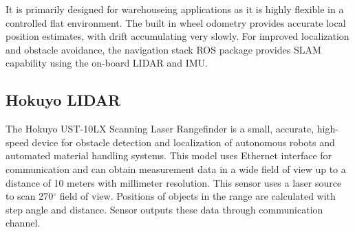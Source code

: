 \documentclass[times, utf8, diplomski, english]{fer}
\begin{document}
It is primarily designed for warehouseing applications as it is highly flexible in a controlled flat environment.
The built in wheel odometry provides accurate local position estimates, with drift accumulating very slowly.
For improved localization and obstacle avoidance, the navigation stack ROS package provides SLAM capability using the on-board LIDAR and IMU.

\subsection{Hokuyo LIDAR}
The Hokuyo UST-10LX Scanning Laser Rangefinder is a small, accurate, high-speed device for obstacle detection and localization of autonomous robots and automated material handling systems. 
This model uses Ethernet interface for communication and can obtain measurement data in a wide field of view up to a distance of 10 meters with millimeter resolution.
This sensor uses a laser source to scan 270$^\circ$ field of view. Positions of objects in the range are calculated with step angle and distance. Sensor outputs these data through communication channel.
\end{document}

